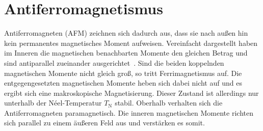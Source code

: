     \section{Antiferromagnetismus} \label{sec:AFM}
        Antiferromagneten (AFM) zeichnen sich dadurch aus, dass sie nach außen hin kein permanentes magnetisches Moment aufweisen.
        Vereinfacht dargestellt haben im Inneren die magnetischen benachbarten Momente den gleichen Betrag und sind antiparallel zueinander ausgerichtet~\cite{Suter}.
        Sind die beiden koppelnden magnetischen Momente nicht gleich groß, so tritt Ferrimagnetismus auf.
        Die entgegengesetzten magnetischen Momente heben sich dabei nicht auf und es ergibt sich eine makroskopische Magnetisierung.
        Dieser Zustand ist allerdings nur unterhalb der Néel-Temperatur $T_\text{N}$ stabil.
        Oberhalb verhalten sich die Antiferromagneten paramagnetisch.
        Die inneren magnetischen Momente richten sich parallel zu einem äußeren Feld aus und verstärken es somit.

